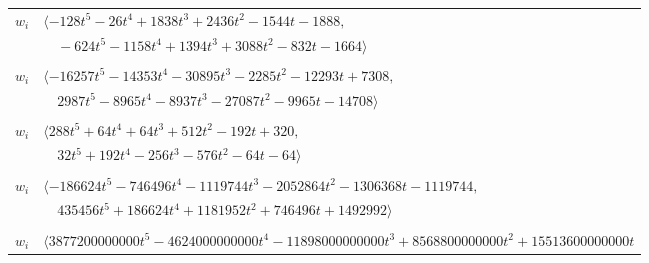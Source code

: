 \documentclass[11pt]{article}
\begin{document}
\begin{longtable}{@{}ll@{}}
$w_i$ & $\langle -128t^{5}-26t^{4}+1838t^{3}+2436t^{2}-1544t-1888,$\\
 & $\quad -624t^{5}-1158t^{4}+1394t^{3}+3088t^{2}-832t-1664\rangle$\\
\addlinespace[2pt]
\multicolumn{2}{@{}p{0.97\textwidth}@{}}{$i=21$, $D_i=1$, $\rho_{ij}$: $2{:}1, \allowbreak 9{:}1, \allowbreak 16{:}3, \allowbreak 23{:}3, \allowbreak 26{:}1, \allowbreak 28{:}3, \allowbreak 32{:}3, \allowbreak 39{:}3, \allowbreak 42{:}1, \allowbreak 45{:}2, \allowbreak 47{:}1, \allowbreak 53{:}2, \allowbreak 58{:}3, \allowbreak 60{:}1, \allowbreak 64{:}1, \allowbreak 65{:}2, \allowbreak 66{:}1, \allowbreak 69{:}2, \allowbreak 77{:}1, \allowbreak 80{:}1$}\\
$w_i$ & $\langle -16257t^{5}-14353t^{4}-30895t^{3}-2285t^{2}-12293t+7308,$\\
 & $\quad 2987t^{5}-8965t^{4}-8937t^{3}-27087t^{2}-9965t-14708\rangle$\\
\addlinespace[2pt]
\multicolumn{2}{@{}p{0.97\textwidth}@{}}{$i=22$, $D_i=4$, $e_i=0$, $\rho_{ij}$: $1{:}2, \allowbreak 20{:}2, \allowbreak 30{:}2, \allowbreak 35{:}2, \allowbreak 39{:}2, \allowbreak 68{:}2, \allowbreak 79{:}2, \allowbreak 80{:}2$}\\
$w_i$ & $\langle 288t^{5}+64t^{4}+64t^{3}+512t^{2}-192t+320,$\\
 & $\quad 32t^{5}+192t^{4}-256t^{3}-576t^{2}-64t-64\rangle$\\
\addlinespace[2pt]
\multicolumn{2}{@{}p{0.97\textwidth}@{}}{$i=23$, $D_i=7776$, $\rho_{ij}$: $0{:}3, \allowbreak 16{:}1, \allowbreak 21{:}1, \allowbreak 29{:}1, \allowbreak 30{:}2, \allowbreak 37{:}1, \allowbreak 39{:}2, \allowbreak 44{:}2, \allowbreak 45{:}1, \allowbreak 49{:}2, \allowbreak 57{:}3, \allowbreak 59{:}1, \allowbreak 60{:}2, \allowbreak 66{:}3$}\\
$w_i$ & $\langle -186624t^{5}-746496t^{4}-1119744t^{3}-2052864t^{2}-1306368t-1119744,$\\
 & $\quad 435456t^{5}+186624t^{4}+1181952t^{2}+746496t+1492992\rangle$\\
\addlinespace[2pt]
\multicolumn{2}{@{}p{0.97\textwidth}@{}}{$i=24$, $D_i=100000000$, $\rho_{ij}$: $15{:}3, \allowbreak 20{:}3, \allowbreak 26{:}2, \allowbreak 34{:}3, \allowbreak 36{:}1, \allowbreak 37{:}2, \allowbreak 39{:}1, \allowbreak 44{:}3, \allowbreak 55{:}1, \allowbreak 59{:}2, \allowbreak 62{:}3, \allowbreak 68{:}1, \allowbreak 70{:}1, \allowbreak 73{:}1, \allowbreak 76{:}3, \allowbreak 77{:}3$}\\
$w_i$ & $\langle 3877200000000t^{5}-4624000000000t^{4}-11898000000000t^{3}+8568800000000t^{2}+15513600000000t$\\

\end{longtable}
\end{document}
